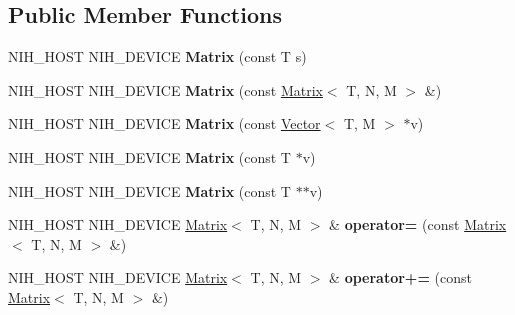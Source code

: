 \subsection*{\-Public \-Member \-Functions}
\begin{DoxyCompactItemize}
\item 
\hypertarget{structnih_1_1_matrix_ad99cac2fa7a266adca8e5465f27025cc}{
\-N\-I\-H\-\_\-\-H\-O\-S\-T \-N\-I\-H\-\_\-\-D\-E\-V\-I\-C\-E {\bfseries \-Matrix} (const \-T s)}
\label{structnih_1_1_matrix_ad99cac2fa7a266adca8e5465f27025cc}

\item 
\hypertarget{structnih_1_1_matrix_aa7cf9f899c88482c15424af1275d6d08}{
\-N\-I\-H\-\_\-\-H\-O\-S\-T \-N\-I\-H\-\_\-\-D\-E\-V\-I\-C\-E {\bfseries \-Matrix} (const \hyperlink{structnih_1_1_matrix}{\-Matrix}$<$ \-T, \-N, \-M $>$ \&)}
\label{structnih_1_1_matrix_aa7cf9f899c88482c15424af1275d6d08}

\item 
\hypertarget{structnih_1_1_matrix_a601e9514aa1a6e2e23b470be0e5fb4a5}{
\-N\-I\-H\-\_\-\-H\-O\-S\-T \-N\-I\-H\-\_\-\-D\-E\-V\-I\-C\-E {\bfseries \-Matrix} (const \hyperlink{structnih_1_1_vector}{\-Vector}$<$ \-T, \-M $>$ $\ast$v)}
\label{structnih_1_1_matrix_a601e9514aa1a6e2e23b470be0e5fb4a5}

\item 
\hypertarget{structnih_1_1_matrix_a3976c6f3ec3cf25394d133f7b87b885e}{
\-N\-I\-H\-\_\-\-H\-O\-S\-T \-N\-I\-H\-\_\-\-D\-E\-V\-I\-C\-E {\bfseries \-Matrix} (const \-T $\ast$v)}
\label{structnih_1_1_matrix_a3976c6f3ec3cf25394d133f7b87b885e}

\item 
\hypertarget{structnih_1_1_matrix_ae3c59b44be7eeb23031a3d614fb6fb19}{
\-N\-I\-H\-\_\-\-H\-O\-S\-T \-N\-I\-H\-\_\-\-D\-E\-V\-I\-C\-E {\bfseries \-Matrix} (const \-T $\ast$$\ast$v)}
\label{structnih_1_1_matrix_ae3c59b44be7eeb23031a3d614fb6fb19}

\item 
\hypertarget{structnih_1_1_matrix_a0dbf1c87533b9e9f78c6421ae43c33ec}{
\-N\-I\-H\-\_\-\-H\-O\-S\-T \-N\-I\-H\-\_\-\-D\-E\-V\-I\-C\-E \hyperlink{structnih_1_1_matrix}{\-Matrix}$<$ \-T, \*
\-N, \-M $>$ \& {\bfseries operator=} (const \hyperlink{structnih_1_1_matrix}{\-Matrix}$<$ \-T, \-N, \-M $>$ \&)}
\label{structnih_1_1_matrix_a0dbf1c87533b9e9f78c6421ae43c33ec}

\item 
\hypertarget{structnih_1_1_matrix_a08b2e9e0a7182126090bde9bc9744458}{
\-N\-I\-H\-\_\-\-H\-O\-S\-T \-N\-I\-H\-\_\-\-D\-E\-V\-I\-C\-E \hyperlink{structnih_1_1_matrix}{\-Matrix}$<$ \-T, \*
\-N, \-M $>$ \& {\bfseries operator+=} (const \hyperlink{structnih_1_1_matrix}{\-Matrix}$<$ \-T, \-N, \-M $>$ \&)}
\label{structnih_1_1_matrix_a08b2e9e0a7182126090bde9bc9744458}


\end{DoxyCompactItemize}
